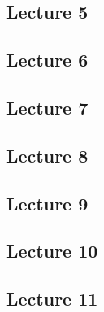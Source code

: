 \documentclass{article}
\begin{document}
\subsection{Lecture 5}

\subsection{Lecture 6}

\subsection{Lecture 7}

\subsection{Lecture 8}

\subsection{Lecture 9}

\subsection{Lecture 10}

\subsection{Lecture 11}
\end{document}
